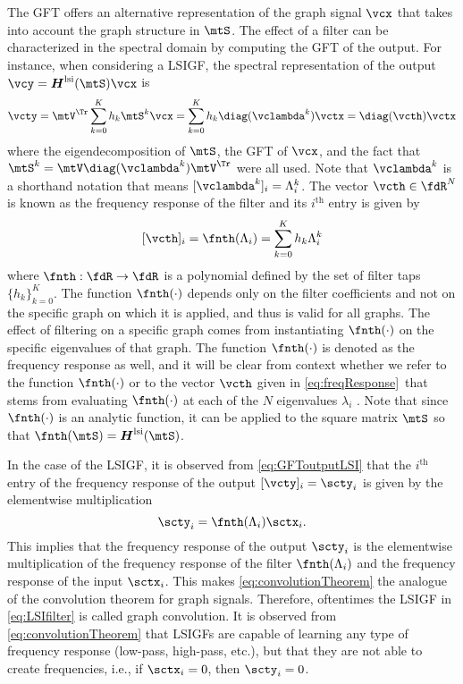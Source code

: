 The GFT offers an alternative representation of the graph signal $\vcx$ that takes into account the graph structure in $\mtS$. The effect of a filter can be characterized in the spectral domain by computing the GFT of the output. For instance, when considering a LSIGF, the spectral representation of the output $\vcy = \mtfnH^{\text{lsi}}(\mtS) \vcx$ is
\begin{equation} \label{eq:GFToutputLSI}
    \vcty = \mtV^{\Tr} \sum_{k=0}^{K} h_{k} \mtS^{k} \vcx = \sum_{k=0}^{K} h_{k} \diag(\vclambda^{k}) \vctx = \diag(\vcth) \vctx
\end{equation}
%
where the eigendecomposition of $\mtS$, the GFT of $\vcx$, and the fact that $\mtS^{k} = \mtV \diag(\vclambda^{k}) \mtV^{\Tr}$ were all used. Note that $\vclambda^{k}$ is a shorthand notation that means $[\vclambda^{k}]_{i} = \lambda_{i}^{k}$. The vector $\vcth \in \fdR^{N}$ is known as the frequency response of the filter and its $i^{\text{th}}$ entry is given by
\begin{equation} \label{eq:freqResponse}
    [\vcth]_{i} = \fnth(\lambda_{i}) = \sum_{k=0}^{K} h_{k} \lambda_{i}^{k}
\end{equation}
%
where $\fnth:\fdR \to \fdR$ is a polynomial defined by the set of filter taps $\{h_{k}\}_{k=0}^K$. The function $\fnth(\cdot)$ depends only on the filter coefficients and not on the specific graph on which it is applied, and thus is valid for all graphs. The effect of filtering on a specific graph comes from instantiating $\fnth(\cdot)$ on the specific eigenvalues of that graph. The function $\fnth(\cdot)$ is denoted as the frequency response as well, and it will be clear from context whether we refer to the function $\fnth(\cdot)$ or to the vector $\vcth$ given in \eqref{eq:freqResponse}\else\
that stems from evaluating $\fnth(\cdot)$ at each of the $N$ eigenvalues $\lambda_{i}$\fi
. Note that since $\fnth(\cdot)$ is an analytic function, it can be applied to the square matrix $\mtS$ so that $\fnth(\mtS) = \mtfnH^{\text{lsi}}(\mtS)$.

In the case of the LSIGF, it is observed from \eqref{eq:GFToutputLSI} that the $i^{\text{th}}$ entry of the frequency response of the output $[\vcty]_{i} = \scty_{i}$ is given by the elementwise multiplication
\begin{equation} \label{eq:convolutionTheorem}
    \scty_{i} = \fnth(\lambda_{i}) \sctx_{i}.
\end{equation}
%
This implies that the frequency response of the output $\scty_{i}$ is the elementwise multiplication of the frequency response of the filter $\fnth(\lambda_{i})$ and the frequency response of the input $\sctx_{i}$.
This makes \eqref{eq:convolutionTheorem} the analogue of the convolution theorem for graph signals. Therefore, oftentimes the LSIGF in \eqref{eq:LSIfilter} is called graph convolution. It is observed from \eqref{eq:convolutionTheorem} that LSIGFs are capable of learning any type of frequency response (low-pass, high-pass, etc.), but that they are not able to create frequencies, i.e., if $\sctx_{i} = 0$, then $\scty_{i} = 0$.

